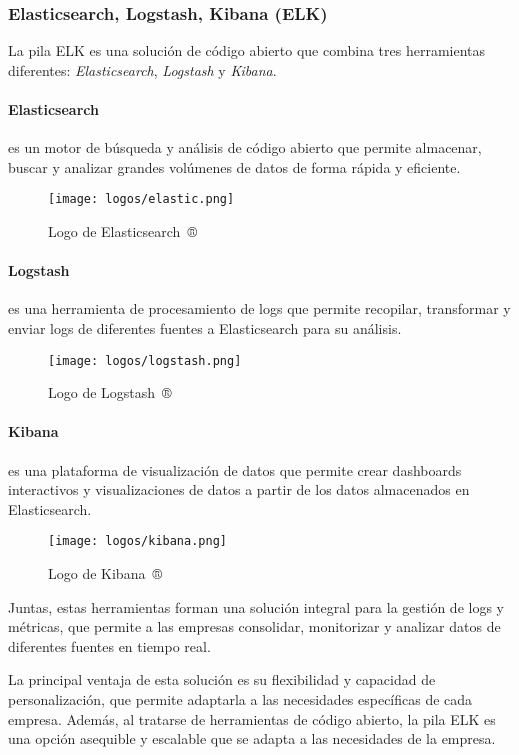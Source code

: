 \subsubsection{Elasticsearch, Logstash, Kibana (ELK)}
La pila ELK es una solución de código abierto que combina tres herramientas
diferentes: \textit{Elasticsearch}, \textit{Logstash} y \textit{Kibana}.

\paragraph{Elasticsearch} es un motor de búsqueda y análisis de código abierto
que permite almacenar, buscar y analizar grandes volúmenes de datos de forma
rápida y eficiente.

\begin{figure}[H]
	\centering
	\texttt{[image: logos/elastic.png]}
	\caption{Logo de Elasticsearch~®}
\end{figure}

\paragraph{Logstash} es una herramienta de procesamiento de logs que permite
recopilar, transformar y enviar logs de diferentes fuentes a Elasticsearch para
su análisis.

\begin{figure}[H]
	\centering
	\texttt{[image: logos/logstash.png]}
	\caption{Logo de Logstash~®}
\end{figure}

\paragraph{Kibana} es una plataforma de visualización de datos que permite
crear dashboards interactivos y visualizaciones de datos a partir de los datos
almacenados en Elasticsearch.

\begin{figure}[H]
	\centering
	\texttt{[image: logos/kibana.png]}
	\caption{Logo de Kibana~®}
\end{figure}

Juntas, estas herramientas forman una solución integral para la
gestión de logs y métricas, que permite a las empresas consolidar, monitorizar y
analizar datos de diferentes fuentes en tiempo real.

La principal ventaja de esta solución es su flexibilidad y capacidad de
personalización, que permite adaptarla a las necesidades específicas de cada
empresa. Además, al tratarse de herramientas de código abierto, la pila ELK es
una opción asequible y escalable que se adapta a las necesidades de la empresa.


